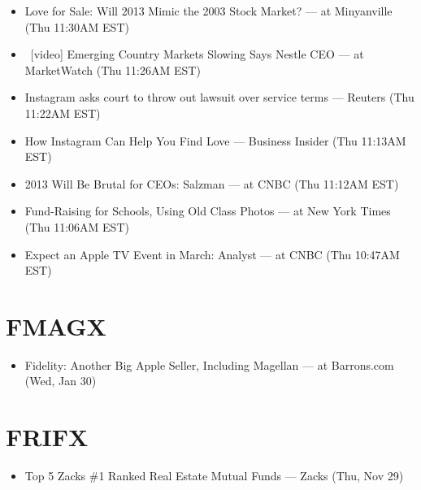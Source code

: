 \documentclass[11pt,asymmetric]{article}
\begin{document}
\begin{itemize}
\item Love for Sale: Will 2013 Mimic the 2003 Stock Market? --- at Minyanville (Thu 11:30AM EST)
\item\ [video] Emerging Country Markets Slowing Says Nestle CEO --- at MarketWatch (Thu 11:26AM EST)
\item Instagram asks court to throw out lawsuit over service terms --- Reuters (Thu 11:22AM EST)
\item How Instagram Can Help You Find Love --- Business Insider (Thu 11:13AM EST)
\item 2013 Will Be Brutal for CEOs: Salzman --- at CNBC (Thu 11:12AM EST)
\item Fund-Raising for Schools, Using Old Class Photos --- at New York Times (Thu 11:06AM EST)
\item Expect an Apple TV Event in March: Analyst --- at CNBC (Thu 10:47AM EST)
\end{itemize}

\section*{FMAGX}
\begin{itemize}
\item Fidelity: Another Big Apple Seller, Including Magellan --- at Barrons.com (Wed, Jan 30)
\end{itemize}

\section*{FRIFX}
\begin{itemize}
\item Top 5 Zacks \#1 Ranked Real Estate Mutual Funds --- Zacks (Thu, Nov 29)
\end{itemize}
\end{document}
